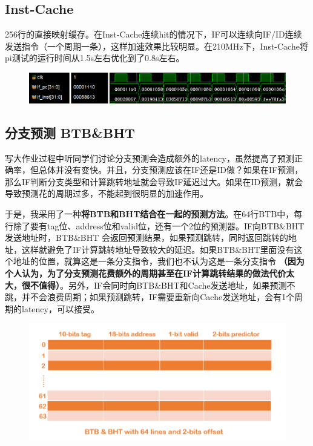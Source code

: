 \documentclass[a4paper,UTF8]{article}
\begin{document}
\subsection{Inst-Cache}
256行的直接映射缓存。在Inst-Cache连续hit的情况下，IF可以连续向IF/ID连续发送指令（一个周期一条），这样加速效果比较明显。在210MHz下，Inst-Cache将pi测试的运行时间从1.5s左右优化到了0.8s左右。
\begin{figure}[h]
    \centering
	\includegraphics[width=1\linewidth]{4.png}
\end{figure}

\subsection{分支预测 BTB\&BHT}
写大作业过程中听同学们讨论分支预测会造成额外的latency，虽然提高了预测正确率，但总体并没有变快。并且，分支预测应该在IF还是ID做？如果在IF预测，那么IF判断分支类型和计算跳转地址就会导致IF延迟过大。如果在ID预测，就会导致预测花的周期过多，不能起到很明显的加速作用。

于是，我采用了一种\textbf{将BTB和BHT结合在一起的预测方法}。在64行BTB中，每行除了要有tag位、address位和valid位，还有一个2位的预测器。IF向BTB\&BHT发送地址时，BTB\&BHT 会返回预测结果，如果预测跳转，同时返回跳转的地址，这样就避免了IF计算跳转地址导致较大的延迟。如果BTB\&BHT里面没有这个地址的位置，就算这是一条分支指令，我们也不认为这是一条分支指令
\textbf{（因为个人认为，为了分支预测花费额外的周期甚至在IF计算跳转结果的做法代价太大，很不值得）}。另外，IF会同时向BTB\&BHT和Cache发送地址，如果预测不跳，并不会浪费周期；如果预测跳转，IF需要重新向Cache发送地址，会有1个周期的latency，可以接受。
\begin{figure}[h]
    \centering
	\includegraphics[width=1\linewidth]{2.png}
\end{figure}
\end{document}

